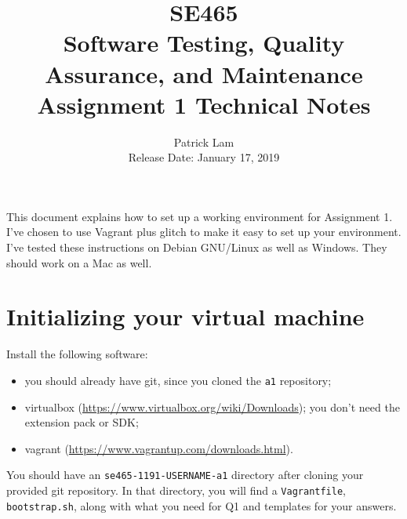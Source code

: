 \documentclass[10pt,hidelinks]{article}
\begin{document}
\title{
SE465 \\
Software Testing, Quality Assurance, and Maintenance\\
Assignment 1 Technical Notes}
\author{Patrick Lam \\
{Release Date:  January 17, 2019} \\
}
\renewcommand{\today}{}
\maketitle


This document explains how to set up a working environment for
Assignment 1. I've chosen to use Vagrant plus glitch to make it easy to set up your
environment. I've tested these instructions on Debian GNU/Linux as
well as Windows. They should work on a Mac as well.

\section*{Initializing your virtual machine}

Install the following software:
\begin{itemize}
\item you should already have git, since you cloned the {\tt a1}
  repository;
\item virtualbox (\url{https://www.virtualbox.org/wiki/Downloads}); you don't need the extension pack or SDK;
\item vagrant (\url{https://www.vagrantup.com/downloads.html}).
\end{itemize}


You should have an {\tt se465-1191-USERNAME-a1} directory after cloning your provided git
repository. In that directory,
you will find a {\tt Vagrantfile}, {\tt bootstrap.sh},
along with what you need for Q1 and templates for your answers.
\end{document}

